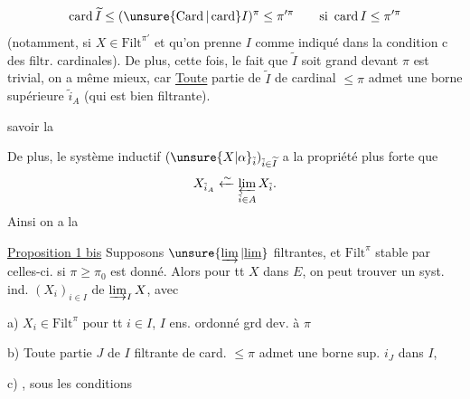 \[
\operatorname{card}\widetilde I\leq(\unsure{\operatorname{Card}|\operatorname{card}}I)^{\pi}\leq\pi'^\pi\qquad\text{si }\operatorname{card}I\leq\pi'^\pi
\]
(notamment, si $X\in\mathrm{Filt}^{\pi'}$ et qu'on prenne $I$ comme indiqué dans la condition c des filtr. cardinales). De plus, cette fois, le fait que $\widetilde I$ soit grand devant $\pi$ est trivial, on a même mieux,  car \uline{Toute} partie  de $\widetilde I$  de cardinal $\leq\pi$ admet une borne supérieure  $\tilde i_A$ (qui est bien filtrante).

savoir la  

De plus, le système inductif $(\unsure{X|\alpha}_{\tilde i})_{\tilde i\in\widetilde I}$ a la propriété plus forte que
\[
X_{\tilde i_A}\xleftarrow{\sim}\varprojlim_{\tilde i\in A}X_{\tilde i}.
\]
Ainsi on a la

\uline{Proposition 1 bis} Supposons   $\unsure{\varinjlim|\underline{\lim}}$ filtrantes, et $\mathrm{Filt}^{\pi}$ stable par celles-ci.  si $\pi\geq\pi_0$ est donné. Alors pour tt $X$ dans $E$, on peut trouver un syst. ind. $(X_i)_{i\in I}$ de $\varinjlim_I X$, avec

a) $X_i\in\mathrm{Filt}^{\pi}$ pour tt $i\in I$, $I$ ens. ordonné grd dev. à $\pi$

b) Toute partie $J$ de $I$ filtrante de card. $\leq\pi$ admet une borne sup. $i_J$ dans $I$,

c) , sous les conditions
